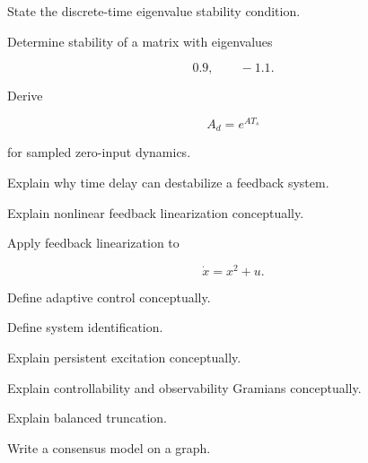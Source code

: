 \begin{exercise}[2]
State the discrete-time eigenvalue stability condition.
\end{exercise}

\begin{exercise}[3]
Determine stability of a matrix with eigenvalues

\[
0.9,
\qquad
-1.1.
\]
\end{exercise}

\begin{exercise}[3]
Derive

\[
A_d=e^{AT_s}
\]

for sampled zero-input dynamics.
\end{exercise}

\begin{exercise}[3]
Explain why time delay can destabilize a feedback system.
\end{exercise}

\begin{exercise}[2]
Explain nonlinear feedback linearization conceptually.
\end{exercise}

\begin{exercise}[3]
Apply feedback linearization to

\[
\dot{x}
=
x^2+u.
\]
\end{exercise}

\begin{exercise}[2]
Define adaptive control conceptually.
\end{exercise}

\begin{exercise}[2]
Define system identification.
\end{exercise}

\begin{exercise}[3]
Explain persistent excitation conceptually.
\end{exercise}

\begin{exercise}[3]
Explain controllability and observability Gramians conceptually.
\end{exercise}

\begin{exercise}[3]
Explain balanced truncation.
\end{exercise}

\begin{exercise}[2]
Write a consensus model on a graph.
\end{exercise}

